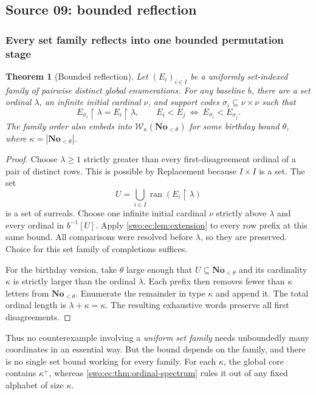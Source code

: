 \documentclass[11pt]{article}
\newtheorem{theorem}{Theorem}[section]
\theoremstyle{definition}
\theoremstyle{remark}
\newcommand{\No}{\mathbf{No}}
\newcommand{\WO}{\mathcal W}
\newcommand{\ran}{\operatorname{ran}}
\newcommand{\res}{\mathbin{\upharpoonright}}
\begin{document}
\subsection{Source 09: bounded reflection}
\label{swo:ec:sec:reflection}
\subsubsection{Every set family reflects into one bounded permutation stage}
\begin{theorem}[Bounded reflection]\label{swo:ec:thm:reflection}
Let $(E_i)_{i\in I}$ be a uniformly set-indexed family of pairwise distinct
global enumerations. For any baseline $b$, there are a set ordinal
$\lambda$, an infinite initial cardinal $\nu$, and support codes
$\sigma_i\subseteq\nu\times\nu$ such that
\[
 E_{\sigma_i}\res\lambda=E_i\res\lambda,
 \qquad
 E_i<E_j\ \Longleftrightarrow\ E_{\sigma_i}<E_{\sigma_j}.
\]
The family order also embeds into $\WO_\kappa(\No_{<\theta})$ for some
birthday bound $\theta$, where $\kappa=|\No_{<\theta}|$.
\end{theorem}
\begin{proof}
Choose $\lambda\ge1$ strictly greater than every first-disagreement
ordinal of a pair of distinct rows. This is possible by Replacement
because $I\times I$ is a set. The set
\[
 U=\bigcup_{i\in I}\ran(E_i\res\lambda)
\]
is a set of surreals. Choose one infinite initial cardinal $\nu$
strictly above $\lambda$ and every ordinal in $b^{-1}[U]$. Apply
\cref{swo:ec:lem:extension} to every row prefix at this same bound. All
comparisons were resolved before $\lambda$, so they are preserved.
Choice for this set family of completions suffices.

For the birthday version, take $\theta$ large enough that $U\subseteq
\No_{<\theta}$ and its cardinality $\kappa$ is strictly larger than the ordinal
$\lambda$. Each prefix then removes fewer than $\kappa$ letters from
$\No_{<\theta}$. Enumerate the remainder in type $\kappa$ and append it.
The total ordinal length is $\lambda+\kappa=\kappa$. The resulting
exhaustive words preserve all first disagreements.
\end{proof}

Thus no counterexample involving a \emph{uniform set family} needs
unboundedly many coordinates in an essential way. But the bound depends
on the family, and there is no single set bound working for every
family. For each $\kappa$, the global core contains $\kappa^+$, whereas
\cref{swo:ec:thm:ordinal-spectrum} rules it out of any fixed alphabet of size
$\kappa$.
\end{document}
